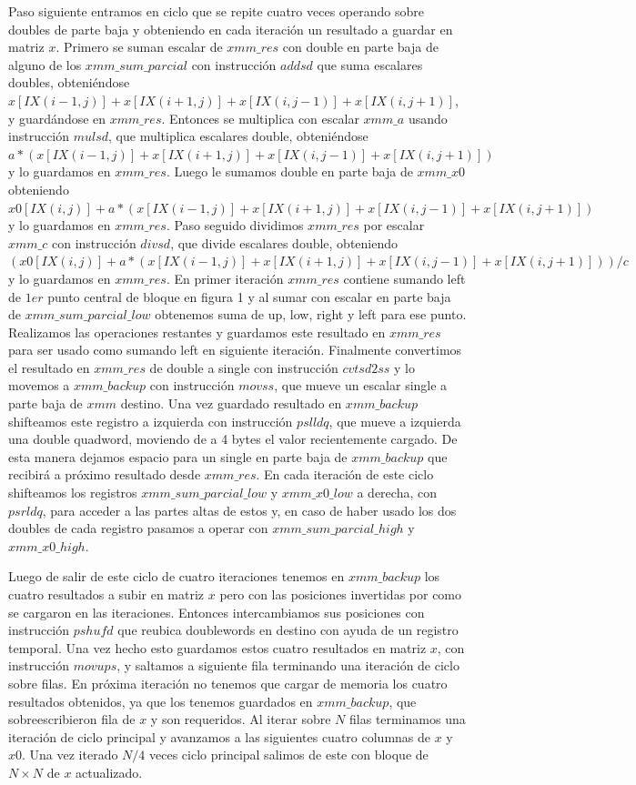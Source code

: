 \par Paso siguiente entramos en ciclo que se repite cuatro veces operando sobre doubles de parte baja y obteniendo en cada iteración un resultado a guardar en matriz $x$. Primero se suman escalar de $xmm\_res$ con double en parte baja de alguno de los $xmm\_sum\_parcial$ con instrucción $addsd$ que suma escalares doubles, obteniéndose $x[IX(i-1,j)]+x[IX(i+1,j)]+x[IX(i,j-1)]+x[IX(i,j+1)]$, y guardándose en $xmm\_res$. Entonces se
multiplica con escalar $xmm\_a$ usando instrucción $mulsd$, que multiplica escalares double, obteniéndose $a*(x[IX(i-1,j)]+x[IX(i+1,j)]+x[IX(i,j-1)]+x[IX(i,j+1)]) $ y lo guardamos en $xmm\_res$.
Luego le sumamos double en parte baja de $xmm\_x0$ obteniendo $x0[IX(i,j)] + a*(x[IX(i-1,j)]+x[IX(i+1,j)]+x[IX(i,j-1)]+x[IX(i,j+1)])$ y lo guardamos en $xmm\_res$.
Paso seguido dividimos $xmm\_res$ por escalar $xmm\_c$ con instrucción $divsd$, que divide escalares
double, obteniendo $(x0[IX(i,j)] + a*(x[IX(i-1,j)]+x[IX(i+1,j)]+x[IX(i,j-1)]+x[IX(i,j+1)]))/c$
y lo guardamos en $xmm\_res$. En primer iteración $xmm\_res$ contiene sumando left de $1er$ punto central de bloque en figura 1 y al sumar con escalar en parte baja de $xmm\_sum\_parcial\_low$ obtenemos suma de up, low, right y left para ese punto. Realizamos las operaciones restantes y guardamos este resultado en $xmm\_res$ para ser usado como sumando left en siguiente iteración.
Finalmente convertimos el resultado en $xmm\_res$ de double a single con instrucción $cvtsd2ss$ y lo movemos a $xmm\_backup$ con instrucción $movss$, que mueve un escalar single a parte baja de $xmm$ destino. 
Una vez guardado resultado en $xmm\_backup$ shifteamos este registro a izquierda con instrucción
$pslldq$, que mueve a izquierda una double quadword, moviendo de a 4 bytes el valor recientemente
cargado. De esta manera dejamos espacio para un single en parte baja de $xmm\_backup$ que recibirá a 
próximo resultado desde $xmm\_res$. En cada iteración de este ciclo shifteamos los registros 
$xmm\_sum\_parcial\_low$ y $xmm\_x0\_low$ a derecha, con $psrldq$, para acceder a las partes altas de estos y, en caso de haber usado los dos doubles de cada registro pasamos a operar con $xmm\_sum\_parcial\_high$ y 
$xmm\_x0\_high$.\newline

\par Luego de salir de este ciclo de cuatro iteraciones tenemos en $xmm\_backup$ los cuatro resultados a subir en matriz $x$ pero con las posiciones invertidas por como se cargaron en las iteraciones. Entonces
intercambiamos sus posiciones con instrucción $pshufd$ que reubica doublewords en destino con 
ayuda de un registro temporal. Una vez hecho esto guardamos estos cuatro resultados en matriz $x$, con instrucción $movups$, y saltamos a siguiente fila terminando una iteración de ciclo sobre filas. En próxima iteración no tenemos que cargar de memoria los cuatro resultados obtenidos, ya que los tenemos guardados en
$xmm\_backup$, que sobreescribieron fila de $x$ y son requeridos.
Al iterar sobre $N$ filas terminamos una iteración de ciclo principal y avanzamos a las siguientes cuatro columnas de $x$ y $x0$. Una vez iterado $N/4$ veces ciclo principal salimos de este con bloque de 
$N\times N$ de $x$ actualizado.\newline

